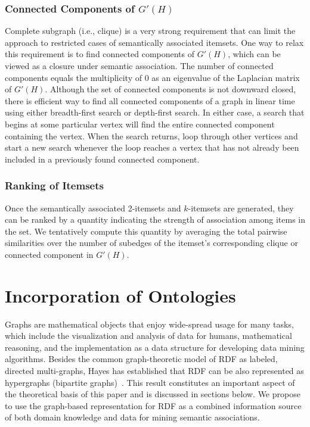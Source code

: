 \subsubsection{Connected Components of $G'(H)$}
Complete subgraph (i.e., clique) is a very strong requirement that can limit the approach to restricted cases of semantically associated itemsets. One way to relax this requirement is to find connected components of $G'(H)$, which can be viewed as a closure under semantic association. The number of connected components equals the multiplicity of 0 as an eigenvalue of the Laplacian matrix of $G'(H)$. Although the set of connected components is not downward closed, there is efficient way to find all connected components of a graph in linear time using either breadth-first search or depth-first search. In either case, a search that begins at some particular vertex will find the entire connected component containing the vertex. When the search returns, loop through other vertices and start a new search whenever the loop reaches a vertex that has not already been included in a previously found connected component.

\subsubsection{Ranking of Itemsets}
Once the semantically associated 2-itemsets and $k$-itemsets are generated, they can be ranked by a quantity indicating the strength of association among items in the set. We tentatively compute this quantity by averaging the total pairwise similarities over the number of subedges of the itemset's corresponding clique or connected component in $G'(H)$.



\section{Incorporation of Ontologies}

Graphs are mathematical objects that enjoy wide-spread usage for many tasks, which include the visualization and analysis of data for humans, mathematical reasoning, and the implementation as a data structure for developing data mining algorithms. Besides the common graph-theoretic model of RDF as labeled, directed multi-graphs, Hayes has established that RDF can be also represented as hypergraphs (bipartite graphs)~\cite{GraphModelRDF}. This result constitutes an important aspect of the theoretical basis of this paper and is discussed in sections below. We propose to use the graph-based representation for RDF as a combined information source of both domain knowledge and data for mining semantic associations.

